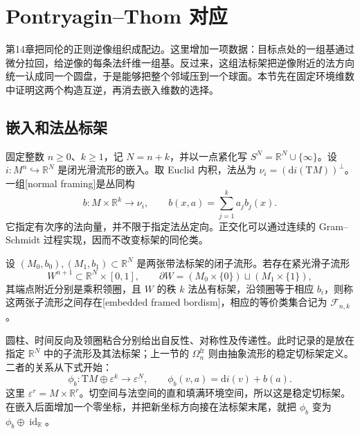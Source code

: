 
% 
% 
% 

\section{Pontryagin–Thom 对应}
\label{g2:sec:2302}

第14章把同伦的正则逆像组织成配边。这里增加一项数据：目标点处的一组基通过微分拉回，给逆像的每条法纤维一组基。反过来，这组法标架把逆像附近的法方向统一认成同一个圆盘，于是能够把整个邻域压到一个球面。本节先在固定环境维数中证明这两个构造互逆，再消去嵌入维数的选择。

\subsection{嵌入和法丛标架}
\label{g2:subsec:2302:01}
固定整数 \(n\ge0\)、\(k\ge1\)，记 \(N=n+k\)，并以一点紧化写 \(S^N=\mathbb R^N\cup\{\infty\}\)。设 \(i:M^n\hookrightarrow\mathbb R^N\) 是闭光滑流形的嵌入。取 Euclid 内积，法丛为 \(\nu_i=(\mathrm di(\mathrm TM))^\perp\)。一组[normal framing]是丛同构
\[
	b:M\times\mathbb R^k\longrightarrow\nu_i,
	\qquad b(x,a)=\sum_{j=1}^ka_jb_j(x).
\]
它指定有次序的法向量，并不限于指定法丛定向。正交化可以通过连续的 Gram--Schmidt 过程实现，因而不改变标架的同伦类。

\begin{definition}\label{g2:def:embedded-framed-bordism}
	设 \((M_0,b_0),(M_1,b_1)\subset\mathbb R^N\) 是两张带法标架的闭子流形。若存在紧光滑子流形
	\[
		W^{n+1}\subset\mathbb R^N\times[0,1],\qquad
		\partial W=(M_0\times\{0\})\sqcup(M_1\times\{1\}),
	\]
	其端点附近分别是乘积领圈，且 \(W\) 的秩 \(k\) 法丛有标架，沿领圈等于相应 \(b_i\)，则称这两张子流形之间存在[embedded framed bordism]，相应的等价类集合记为 \(\mathcal F_{n,k}\)。
\end{definition}

圆柱、时间反向及领圈粘合分别给出自反性、对称性及传递性。此时记录的是放在指定 \(\mathbb R^N\) 中的子流形及其法标架；上一节的 \(\Omega_n^{\mathrm{fr}}\) 则由抽象流形的稳定切标架定义。二者的关系从下式开始：
\begin{equation}\label{g2:eq:normal-to-tangent-framing}
	\phi_b:\mathrm TM\oplus\varepsilon^k\longrightarrow\varepsilon^N,
	\qquad \phi_b(v,a)=\mathrm di(v)+b(a).
\end{equation}
这里 \(\varepsilon^r=M\times\mathbb R^r\)。切空间与法空间的直和填满环境空间，所以这是稳定切标架。在嵌入后面增加一个零坐标，并把新坐标方向接在法标架末尾，就把 \(\phi_b\) 变为 \(\phi_b\oplus\operatorname{id}_{\mathbb R}\)。

